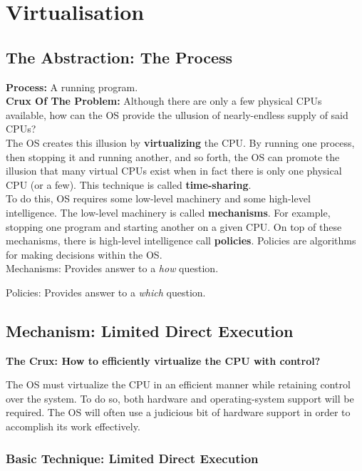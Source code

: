\chapter{Virtualisation}

\section{The Abstraction: The Process}

\textbf{Process:} A running program.\\

\textbf{Crux Of The Problem:} Although there are only a few physical CPUs
available, how can the OS provide the ullusion of nearly-endless supply of 
said CPUs?\\

The OS creates this illusion by \textbf{virtualizing} the CPU. By running
one process, then stopping it and running another, and so forth, the OS can
promote the illusion that many virtual CPUs exist when in fact there is only
one physical CPU (or a few). This technique is called \textbf{time-sharing}.\\

To do this, OS requires some low-level machinery and some
high-level intelligence. The low-level machinery is called \textbf{mechanisms}.
For example, stopping one program and starting another on a given CPU. On top
of these mechanisms, there is high-level intelligence call \textbf{policies}.
Policies are algorithms for making decisions within the OS.\\

Mechanisms: Provides answer to a \textit{how} question.

Policies: Provides answer to a \textit{which} question.\\

\section{Mechanism: Limited Direct Execution}

\textbf{The Crux: How to efficiently virtualize the CPU with control?}

The OS must virtualize the CPU in an efficient manner while retaining control
over the system. To do so, both hardware and operating-system support will be
required. The OS will often use a judicious bit of hardware support in order to
accomplish its work effectively.

\subsection{Basic Technique: Limited Direct Execution}

